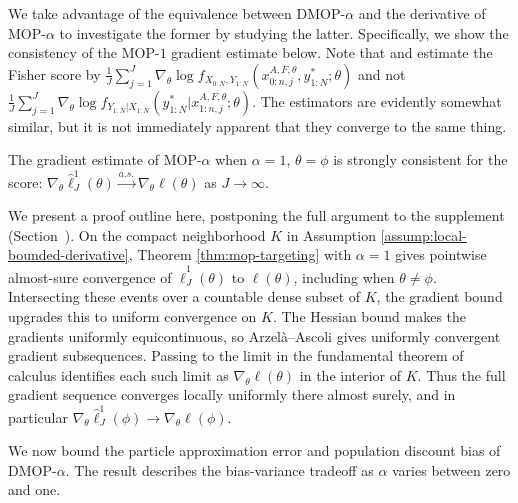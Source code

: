 \documentclass[11pt]{article}
\begin{document}
We take advantage of the equivalence between DMOP-$\alpha$ and the derivative of MOP-$\alpha$ to investigate the former by studying the latter.
Specifically, we show the consistency of the MOP-$1$ gradient estimate below.
Note that \cite{poyiadjis11} and \cite{scibior21} estimate the Fisher score by 
$\frac{1}{J}\sum_{j=1}^J \nabla_\theta \log f_{X_{0:N}, Y_{1:N}}(x_{0:n,j}^{A, F,\theta}, y_{1:N}^* ; \theta)$ and not
$\frac{1}{J}\sum_{j=1}^J \nabla_\theta \log f_{Y_{1:N}| X_{1:N}}(y_{1:N}^* | x_{1:n,j}^{A, F,\theta}; \theta).$
The estimators are evidently somewhat similar, but it is not immediately apparent that they converge to the same thing.

\begin{thm}
    The gradient estimate of MOP-$\alpha$ when $\alpha=1$, $\theta=\phi$ is strongly consistent for the score: $\nabla_\theta \hat\ell_J^1(\theta) \stackrel{a.s.}{\to} \nabla_\theta \ell(\theta)$ as $J \to \infty$.
    \label{thm:mop-grad-consistency}
\end{thm}

We present a proof outline here, postponing the full argument to the supplement (Section~\suppSecProofConsistency).
On the compact neighborhood $K$ in Assumption \ref{assump:local-bounded-derivative}, Theorem \ref{thm:mop-targeting} with $\alpha=1$ gives pointwise almost-sure convergence of $\hat\ell_J^1(\theta)$ to $\ell(\theta)$, including when $\theta\ne\phi$. Intersecting these events over a countable dense subset of $K$, the gradient bound upgrades this to uniform convergence on $K$. The Hessian bound makes the gradients uniformly equicontinuous, so Arzel\`a--Ascoli gives uniformly convergent gradient subsequences. Passing to the limit in the fundamental theorem of calculus identifies each such limit as $\nabla_\theta\ell(\theta)$ in the interior of $K$. Thus the full gradient sequence converges locally uniformly there almost surely, and in particular $\nabla_\theta\hat\ell_J^1(\phi)\to\nabla_\theta\ell(\phi)$.

We now bound the particle approximation error and population discount bias of DMOP-$\alpha$.
The result describes the bias-variance tradeoff as $\alpha$ varies between zero and one.
\end{document}

